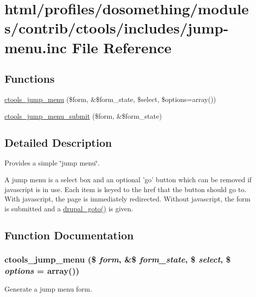 \hypertarget{jump-menu_8inc}{
\section{html/profiles/dosomething/modules/contrib/ctools/includes/jump-\/menu.inc File Reference}
\label{jump-menu_8inc}
}
\subsection*{Functions}
\begin{DoxyCompactItemize}
\item 
\hyperlink{jump-menu_8inc_aaacb11546fb51a4ab5416740a18a5e67}{ctools\_\-jump\_\-menu} (\$form, \&\$form\_\-state, \$select, \$options=array())
\item 
\hyperlink{jump-menu_8inc_a68fece12f8d911934a1ffb41f0e30188}{ctools\_\-jump\_\-menu\_\-submit} (\$form, \&\$form\_\-state)
\end{DoxyCompactItemize}


\subsection{Detailed Description}
Provides a simple \char`\"{}jump menu\char`\"{}.

A jump menu is a select box and an optional 'go' button which can be removed if javascript is in use. Each item is keyed to the href that the button should go to. With javascript, the page is immediately redirected. Without javascript, the form is submitted and a \hyperlink{group__http__handling_ga5b68d7a934713d1d623b2b32a732235d}{drupal\_\-goto()} is given. 

\subsection{Function Documentation}
\hypertarget{jump-menu_8inc_aaacb11546fb51a4ab5416740a18a5e67}{
\subsubsection[{ctools\_\-jump\_\-menu}]{\setlength{\rightskip}{0pt plus 5cm}ctools\_\-jump\_\-menu (\$ {\em form}, \/  \&\$ {\em form\_\-state}, \/  \$ {\em select}, \/  \$ {\em options} = {\ttfamily array()})}}
\label{jump-menu_8inc_aaacb11546fb51a4ab5416740a18a5e67}
Generate a jump menu form.

